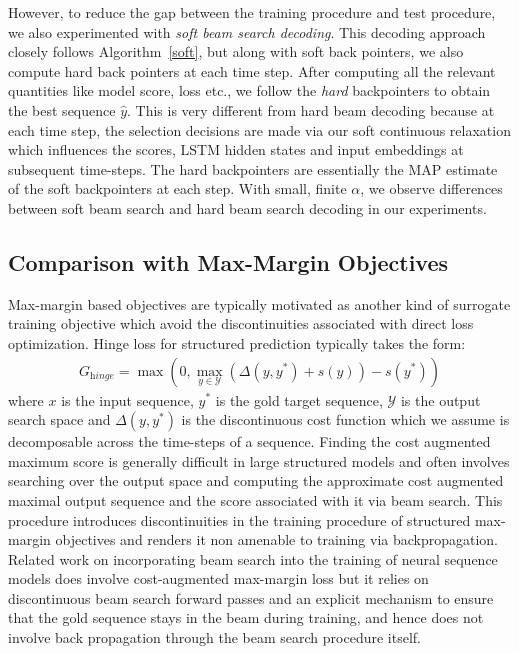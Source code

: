 \documentclass[letterpaper]{article} \usepackage{aaai18}  \usepackage{times}  \usepackage{helvet}  \usepackage{courier}  \usepackage{url}  \usepackage{graphicx}  \frenchspacing
\begin{document}
However, to reduce the gap between the training procedure and test procedure, we also experimented with \emph{soft beam search decoding}. This decoding approach closely follows Algorithm~\ref{soft}, but along with soft back pointers, we also compute hard back pointers at each time step. After computing all the relevant quantities like model score, loss etc., we follow the \emph{hard} backpointers to obtain the best sequence $\hat{y}$. This is very different from hard beam decoding because at each time step, the selection decisions are made via our soft continuous relaxation which influences the scores, LSTM hidden states and input embeddings at subsequent time-steps. The hard backpointers are essentially the MAP estimate of the soft backpointers at each step. With small, finite $\alpha$, we observe differences between soft beam search and hard beam search decoding in our experiments.

\subsection{Comparison with Max-Margin Objectives \label{maxm}}
Max-margin based objectives are typically motivated as another kind of surrogate training objective which avoid the discontinuities associated with direct loss optimization. Hinge loss for structured prediction typically takes the form:
\begin{align*}
    G_{\textit{hinge}} = \max(0,\max_{y \in \mathcal{Y}}(\Delta(y,y^*)+ s(y)) - s(y^*))
\end{align*}
where $x$ is the input sequence, $y^*$ is the gold target sequence, $\mathcal{Y}$ is the output search space and $\Delta(y,y^*)$ is the discontinuous cost function which we assume is decomposable across the time-steps of a sequence. Finding the cost augmented maximum score is generally difficult in large structured models and often involves searching over the output space and computing the approximate cost augmented maximal output sequence and the score associated with it via beam search. This procedure introduces discontinuities in the training procedure of structured max-margin objectives and renders it non amenable to training via backpropagation. Related work \cite{wiseman2016sequence} on incorporating beam search into the training of neural sequence models does involve cost-augmented max-margin loss but it relies on discontinuous beam search forward passes and an explicit mechanism to ensure that the gold sequence stays in the beam during training, and hence does not involve back propagation through the beam search procedure itself.
\end{document}
